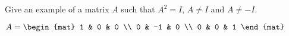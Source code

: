 \index{}

\begin{Exercise}[
name={},
title={}, 
difficulty=0,
origin={\cite{KK}}]
Give an example of a matrix $A$ such that $A^{2}=I$, $A\neq I$
and $A\neq -I.$ 
\end{Exercise}
\begin{Answer}
$A =
\begin{mat}
1 & 0 & 0 \\
0 & -1 & 0 \\
0 & 0 & 1
\end{mat}$
\end{Answer}
